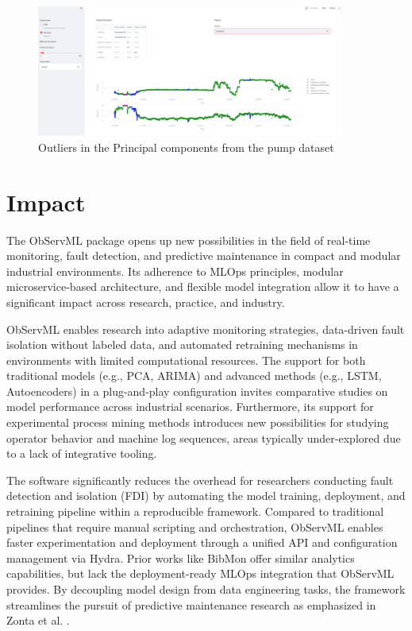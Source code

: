\documentclass[preprint,12pt, a4paper]{elsarticle}
\begin{document}
\begin{figure}[h!]%
\includegraphics[width=0.9\textwidth, clip, trim={0 0 0 0}]{figs/pca_outliers.png}
{\caption{Outliers in the Principal components from the pump dataset}
\label{pca_outliers}}
\end{figure}




\clearpage

\section{Impact}

The ObServML package opens up new possibilities in the field of real-time monitoring, fault detection, and predictive maintenance in compact and modular industrial environments. Its adherence to MLOps principles, modular microservice-based architecture, and flexible model integration allow it to have a significant impact across research, practice, and industry.

ObServML enables research into adaptive monitoring strategies, data-driven fault isolation without labeled data, and automated retraining mechanisms in environments with limited computational resources. The support for both traditional models (e.g., PCA, ARIMA) and advanced methods (e.g., LSTM, Autoencoders) in a plug-and-play configuration invites comparative studies on model performance across industrial scenarios. Furthermore, its support for experimental process mining methods introduces new possibilities for studying operator behavior and machine log sequences, areas typically under-explored due to a lack of integrative tooling.

The software significantly reduces the overhead for researchers conducting fault detection and isolation (FDI) by automating the model training, deployment, and retraining pipeline within a reproducible framework. Compared to traditional pipelines that require manual scripting and orchestration, ObServML enables faster experimentation and deployment through a unified API and configuration management via Hydra. Prior works like BibMon \cite{MELO2024100182} offer similar analytics capabilities, but lack the deployment-ready MLOps integration that ObServML provides. By decoupling model design from data engineering tasks, the framework streamlines the pursuit of predictive maintenance research as emphasized in Zonta et al. \cite{ZONTA2020106889}.
\end{document}
